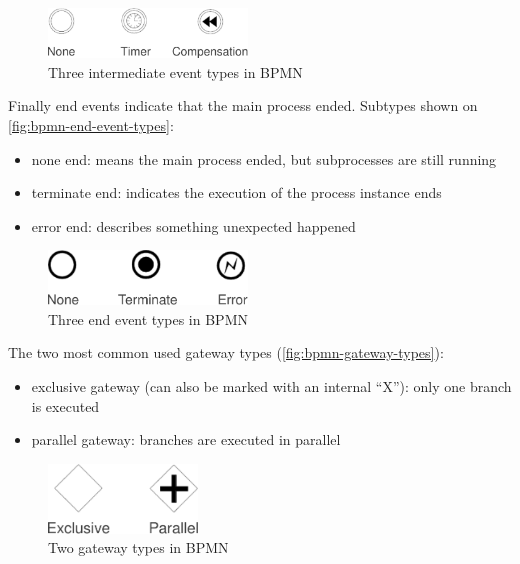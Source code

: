\begin{figure}[H]
\centering
\includegraphics[width=200px,keepaspectratio]{bpmn-intermediate-event-types.pdf}
\caption{Three intermediate event types in BPMN}
\label{fig:bpmn-intermediate-event-types}
\end{figure}

Finally end events indicate that the main process ended. Subtypes shown on
\autoref{fig:bpmn-end-event-types}:

\begin{itemize}
\item none end: means the main process ended, but subprocesses are still running
\item terminate end: indicates the execution of the process instance ends
\item error end: describes something unexpected happened
\end{itemize}

\begin{figure}[H]
\centering
\includegraphics[width=200px,keepaspectratio]{bpmn-end-event-types.pdf}
\caption{Three end event types in BPMN}
\label{fig:bpmn-end-event-types}
\end{figure}

The two most common used gateway types (\autoref{fig:bpmn-gateway-types}):

\begin{itemize}
\item exclusive gateway (can also be marked with an internal ``X''): only one branch is executed
\item parallel gateway: branches are executed in parallel
\end{itemize}

\begin{figure}[H]
\centering
\includegraphics[width=150px,keepaspectratio]{bpmn-gateway-types.pdf}
\caption{Two gateway types in BPMN}
\label{fig:bpmn-gateway-types}
\end{figure}

